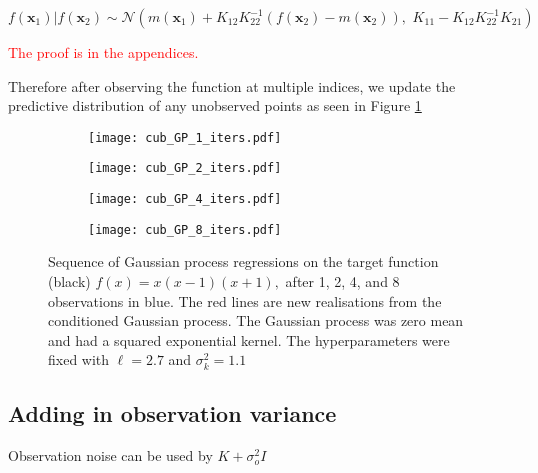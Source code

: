 $$
    f(\mathbf{x}_1) | f(\mathbf{x}_2)
    \sim \mathcal{N}\left(
    m(\mathbf{x}_1) + K_{12}K_{22}^{-1}(f(\mathbf{x}_2) - m(\mathbf{x}_2)), \,\,
    K_{11} - K_{12}K_{22}^{-1}K_{21}
    \right)
$$

\textcolor{red}{The proof is in the appendices.}

Therefore after observing the function at multiple indices, we update the
predictive distribution of any unobserved points as seen in Figure \ref{fig:no_var_cub_reg}

\begin{figure}[htbp]
    \centering
    \begin{subfigure}[b]{0.5\textwidth}
        \centering
        \texttt{[image: cub\_GP\_1\_iters.pdf]}
    \end{subfigure}%
    \hfill%
    \begin{subfigure}[b]{0.5\textwidth}
        \centering
        \texttt{[image: cub\_GP\_2\_iters.pdf]}
    \end{subfigure}
    \begin{subfigure}[b]{0.5\textwidth}
        \centering
        \texttt{[image: cub\_GP\_4\_iters.pdf]}
    \end{subfigure}%
    \hfill%
    \begin{subfigure}[b]{0.5\textwidth}
        \centering
        \texttt{[image: cub\_GP\_8\_iters.pdf]}
    \end{subfigure}%
    \caption{
        Sequence of Gaussian process regressions on the target function
        (black) $f(x) = x(x-1)(x+1),$ after 1, 2, 4, and 8 observations in
        blue. The red lines are new realisations from the conditioned Gaussian
        process. The Gaussian process was zero mean and had a squared
        exponential kernel. The hyperparameters were fixed with $\ell = 2.7$
        and $\sigma^2_k = 1.1$
    }
    \label{fig:no_var_cub_reg}
\end{figure}

\subsection*{Adding in observation variance}

Observation noise can be used by $K + \sigma^2_o I$

